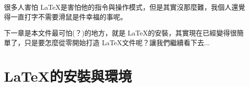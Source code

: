 \documentclass[12pt, letterpaper]{article}
\begin{document}
很多人害怕 \LaTeX 是害怕他的指令與操作模式，但是其實沒那麼難，我個人還覺得一直打字不需要滑鼠是件幸福的事呢。

下一章是本文件最可怕(？)的地方，就是 \LaTeX 的安裝，其實現在已經變得很簡單了，只是要怎麼從零開始打造 \LaTeX 文件呢？讓我們繼續看下去...

\section{\LaTeX 的安裝與環境}
\end{document}
